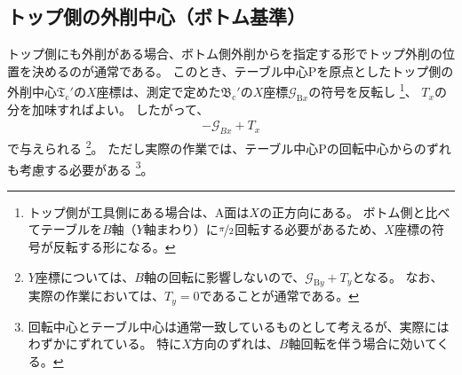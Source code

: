 \subsection{トップ側の外削中心（ボトム基準）}
トップ側にも外削がある場合、ボトム側外削から\CenterlineEndFaceDif を指定する形でトップ外削の位置を決めるのが通常である。
このとき、テーブル中心Pを原点としたトップ側の外削中心$\mathfrak T_\mathrm c'$の$X$座標は、測定で定めた$\mathfrak B_\mathrm c'$の$X$座標$\mathcal G_{\mathrm Bx}$の符号を反転し
\footnote{トップ側が工具側にある場合は、A面は$X$の正方向にある。
ボトム側と比べてテーブルを$B$軸（$Y$軸まわり）に$\nicefrac\pi2$回転する必要があるため、$X$座標の符号が反転する形になる。}、
\CenterlineEndFaceDifAC$T_x$の分を加味すればよい。
したがって、
\begin{align}
  \label{eq:BbasedTx}
  -\mathcal G_{Bx}+T_x
\end{align}
で与えられる
\footnote{$Y$座標については、$B$軸の回転に影響しないので、$\mathcal G_{\mathrm By}+T_y$となる。
なお、実際の作業においては、$T_y = 0$であることが通常である。}。
ただし実際の作業では、テーブル中心Pの回転中心からのずれも考慮する必要がある
\footnote{回転中心とテーブル中心は通常一致しているものとして考えるが、実際にはわずかにずれている。
特に$X$方向のずれは、$B$軸回転を伴う場合に効いてくる。}。



\clearpage


